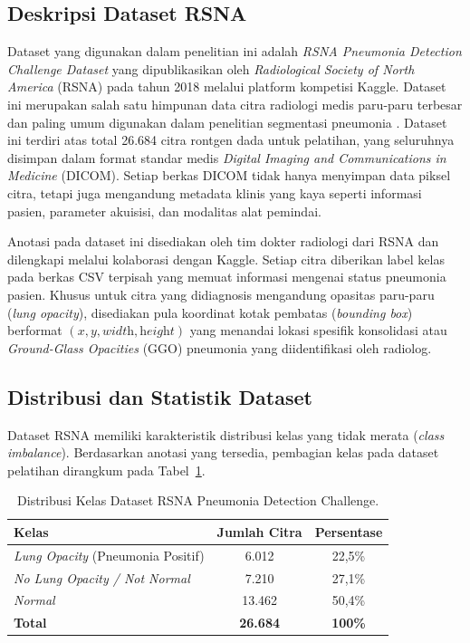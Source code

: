 \documentclass[12pt,a4paper,oneside]{book}
\begin{document}
\subsection{Deskripsi Dataset RSNA}

Dataset yang digunakan dalam penelitian ini adalah \textit{RSNA Pneumonia Detection Challenge Dataset} yang dipublikasikan oleh \textit{Radiological Society of North America} (RSNA) pada tahun 2018 melalui platform kompetisi Kaggle. Dataset ini merupakan salah satu himpunan data citra radiologi medis paru-paru terbesar dan paling umum digunakan dalam penelitian segmentasi pneumonia \parencite{seth2022}. Dataset ini terdiri atas total 26.684 citra rontgen dada untuk pelatihan, yang seluruhnya disimpan dalam format standar medis \textit{Digital Imaging and Communications in Medicine} (DICOM). Setiap berkas DICOM tidak hanya menyimpan data piksel citra, tetapi juga mengandung metadata klinis yang kaya seperti informasi pasien, parameter akuisisi, dan modalitas alat pemindai.

Anotasi pada dataset ini disediakan oleh tim dokter radiologi dari RSNA dan dilengkapi melalui kolaborasi dengan Kaggle. Setiap citra diberikan label kelas pada berkas CSV terpisah yang memuat informasi mengenai status pneumonia pasien. Khusus untuk citra yang didiagnosis mengandung opasitas paru-paru (\textit{lung opacity}), disediakan pula koordinat kotak pembatas (\textit{bounding box}) berformat $(x, y, \textit{width}, \textit{height})$ yang menandai lokasi spesifik konsolidasi atau \textit{Ground-Glass Opacities} (GGO) pneumonia yang diidentifikasi oleh radiolog.

\subsection{Distribusi dan Statistik Dataset}

Dataset RSNA memiliki karakteristik distribusi kelas yang tidak merata (\textit{class imbalance}). Berdasarkan anotasi yang tersedia, pembagian kelas pada dataset pelatihan dirangkum pada Tabel~\ref{tab:distribusi_dataset}.

\begin{table}[H]
  \centering
  \caption{Distribusi Kelas Dataset RSNA Pneumonia Detection Challenge.}
  \label{tab:distribusi_dataset}
  \begin{tabular}{l c c}
    \toprule
    \textbf{Kelas} & \textbf{Jumlah Citra} & \textbf{Persentase} \\
    \midrule
    \textit{Lung Opacity} (Pneumonia Positif) & 6.012  & 22,5\% \\
    \textit{No Lung Opacity / Not Normal}     & 7.210  & 27,1\% \\
    \textit{Normal}                            & 13.462 & 50,4\% \\
    \midrule
    \textbf{Total}                             & \textbf{26.684} & \textbf{100\%} \\
    \bottomrule
  \end{tabular}
\end{table}
\end{document}
